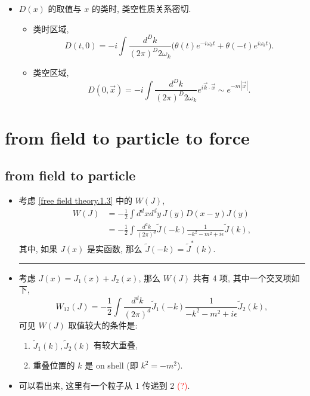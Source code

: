 \begin{itemize}
	\item $D(x)$ 的取值与 $x$ 的类时, 类空性质关系密切.
	\begin{itemize}
		\item 类时区域,
		\begin{equation}
			D(t, 0) = - i \int \frac{d^D k}{(2 \pi)^D 2 \omega_k} \Big( \theta(t) e^{- i \omega_k t} + \theta(- t) e^{i \omega_k t} \Big).
		\end{equation}
		
		\item 类空区域,
		\begin{equation}
			D(0, \vec{x}) = - i \int \frac{d^D k}{(2 \pi)^D 2 \omega_k} e^{i \vec{k} \cdot \vec{x}} \sim e^{- m |\vec{x}|}.
		\end{equation}
	\end{itemize}
\end{itemize}

\section{from field to particle to force}
\subsection{from field to particle}
\begin{itemize}
	\item 考虑 \eqref{free field theory.1.3} 中的 $W(J)$,
	\begin{align}
		W(J) &= - \frac{1}{2} \int d^d x d^d y \, J(y) D(x - y) J(y) \\
		&= - \frac{1}{2} \int \frac{d^d k}{(2 \pi)^d} \tilde{J}(- k) \frac{1}{- k^2 - m^2 + i \epsilon} \tilde{J}(k),
	\end{align}
	其中, 如果 $J(x)$ 是实函数, 那么 $\tilde{J}(- k) = \tilde{J}^*(k)$.
	
	\noindent\rule[0.5ex]{\linewidth}{0.5pt} %
	
	\item 考虑 $J(x) = J_1(x) + J_2(x)$, 那么 $W(J)$ 共有 4 项, 其中一个交叉项如下,
	\begin{equation}
		W_{1 2}(J) = - \frac{1}{2} \int \frac{d^d k}{(2 \pi)^d} \tilde{J}_1(- k) \frac{1}{- k^2 - m^2 + i \epsilon} \tilde{J}_2(k),
	\end{equation}
	可见 $W(J)$ 取值较大的条件是:
	\begin{enumerate}
		\item $\tilde{J}_1(k), \tilde{J}_2(k)$ 有较大重叠,
		
		\item 重叠位置的 $k$ 是 on shell (即 $k^2 = - m^2$).
	\end{enumerate}
	
	\item 可以看出来, 这里有一个粒子从 1 传递到 2 \textcolor{red}{(?)}.
\end{itemize}

